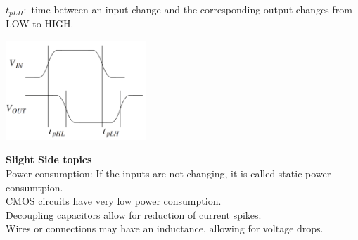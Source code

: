 \documentclass[nobib]{tufte-handout}
\newcommand{\defn}[2]{\noindent\textbf{#1}:\ #2}
\begin{document}
\defn{$t_{pLH}$}{time between an input change and the corresponding output changes from LOW to HIGH.}\\
\begin{center}
    \includegraphics[width = 200px]{images/propdelaygraph.png}
\end{center}
\begin{mdframed}
    \textbf{Slight Side topics}\\
    Power consumption:  If the inputs are not changing, it is called static power consumtpion.\\
    CMOS circuits have very low power consumption.\\
    Decoupling capacitors allow for reduction of current spikes.\\
    Wires or connections may have an inductance, allowing for voltage drops.\\
\end{mdframed}
\end{document}
